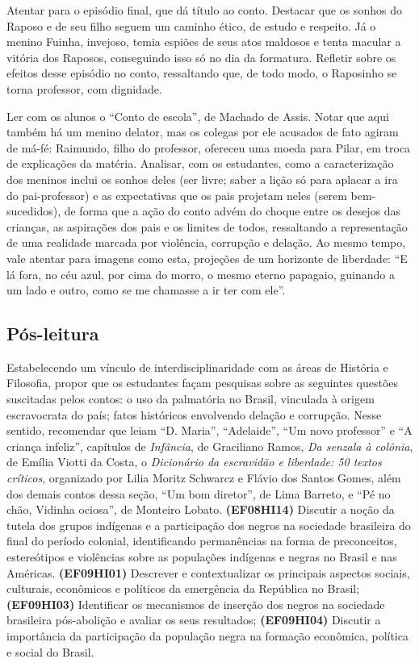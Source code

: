 Atentar para o episódio final, que dá título ao conto. Destacar que os
sonhos do Raposo e de seu filho seguem um caminho ético, de estudo e
respeito. Já o menino Fuinha, invejoso, temia espiões de seus atos
maldosos e tenta macular a vitória dos Raposos, conseguindo isso só no
dia da formatura. Refletir sobre os efeitos desse episódio no conto,
ressaltando que, de todo modo, o Raposinho se torna professor, com
dignidade.

Ler com os alunos o ``Conto de escola'', de Machado de Assis. Notar que
aqui também há um menino delator, mas os colegas por ele acusados de
fato agiram de má-fé: Raimundo, filho do professor, ofereceu uma moeda
para Pilar, em troca de explicações da matéria. Analisar, com os
estudantes, como a caracterização dos meninos inclui os sonhos deles
(ser livre; saber a lição só para aplacar a ira do pai-professor) e as
expectativas que os pais projetam neles (serem bem-sucedidos), de forma
que a ação do conto advém do choque entre os desejos das crianças, as
aspirações dos pais e os limites de todos, ressaltando a representação
de uma realidade marcada por violência, corrupção e delação. Ao mesmo
tempo, vale atentar para imagens como esta, projeções de um horizonte de
liberdade: ``E lá fora, no céu azul, por cima do morro, o mesmo eterno
papagaio, guinando a um lado e outro, como se me chamasse a ir ter com
ele''.

\subsection{Pós-leitura}

Estabelecendo um vínculo de interdisciplinaridade com as áreas de
História e Filosofia, propor que os estudantes façam pesquisas sobre as
seguintes questões suscitadas pelos contos: o uso da palmatória no
Brasil, vinculada à origem escravocrata do país; fatos históricos
envolvendo delação e corrupção. Nesse sentido, recomendar que leiam ``D.
Maria'', ``Adelaide'', ``Um novo professor'' e ``A criança infeliz'',
capítulos de \emph{Infância}, de Graciliano Ramos, \emph{Da senzala à
colônia}, de Emília Viotti da Costa, o \emph{Dicionário da escravidão e
liberdade: 50 textos críticos}, organizado por Lilia Moritz Schwarcz e
Flávio dos Santos Gomes, além dos demais contos dessa seção, ``Um bom
diretor'', de Lima Barreto, e ``Pé no chão, Vidinha ociosa'', de
Monteiro Lobato. \textbf{(EF08HI14)} Discutir a noção da tutela dos
grupos indígenas e a participação dos negros na sociedade brasileira do
final do período colonial, identificando permanências na forma de
preconceitos, estereótipos e violências sobre as populações indígenas e
negras no Brasil e nas Américas. \textbf{(EF09HI01)} Descrever e
contextualizar os principais aspectos sociais, culturais, econômicos e
políticos da emergência da República no Brasil; \textbf{(EF09HI03)}
Identificar os mecanismos de inserção dos negros na sociedade brasileira
pós-abolição e avaliar os seus resultados; \textbf{(EF09HI04)} Discutir
a importância da participação da população negra na formação econômica,
política e social do Brasil.

